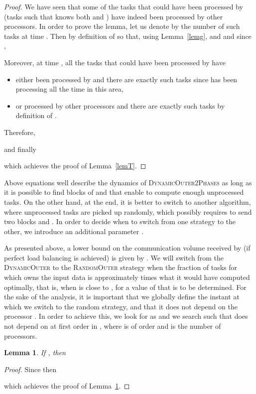 \documentclass[a4paper,10pt]{article}
\newtheorem{lemma}[theorem]{Lemma}
\newcommand{\simplerandom}{\textsc{Random\-Outer}\xspace}
\newcommand{\stupid}{\textsc{Dynamic\-Outer}\xspace}
\newcommand{\stupidthreshold}{\textsc{Dynamic\-Outer\-2Phases}\xspace}
\begin{document}
\begin{proof}
  We have seen that some of the tasks that could have been processed
  by  (tasks  such that  knows both  and
  ) have indeed been processed by other processors. In order to
  prove the lemma, let us denote by  the number of such tasks
  at time . Then
 by definition of  so that, using Lemma~\ref{lemg},
 and
 and since ,


Moreover, at time , all the tasks that could have been processed by  have
\begin{itemize}
\item either been processed by  and there are exactly  such tasks since  has been  processing all the time in this area,
\item or processed by other processors and there are exactly  such tasks by definition of .
\end{itemize}
Therefore,

and finally

which achieves the proof of Lemma~\ref{lemT}.
\end{proof}
\medskip

Above equations well describe the dynamics of \stupidthreshold as long
as it is possible to find blocks of  and  that enable to compute
enough unprocessed tasks. On the other hand, at the end, it is better
to switch to another algorithm, where unprocessed tasks
 are picked up randomly, which possibly requires to send two
blocks  and . In order to decide when to switch from one
strategy to the other, we introduce an additional parameter .


As presented above, a lower bound on the communication volume received
by  (if perfect load balancing is achieved) is given by .  We will switch from the \stupid to
the \simplerandom strategy when the fraction of tasks  for
which  owns the input data is approximately  times what it
would have computed optimally, that is, when  is close to
, for a value of
 that is to be determined. For the sake of the analysis, it is
important that we globally define the instant at which we switch to
the random strategy, and that it does not depend on the processor
. In order to achieve this, we look for  as  and we search 
such that  does not depend on  at first order in
, where  is of order  and 
is the number of processors.


\begin{lemma}
\label{lembeta}
If , then 
\end{lemma}

\begin{proof}
  Since  then
  
  which achieves the proof of Lemma~\ref{lembeta}.
\end{proof}
\end{document}
